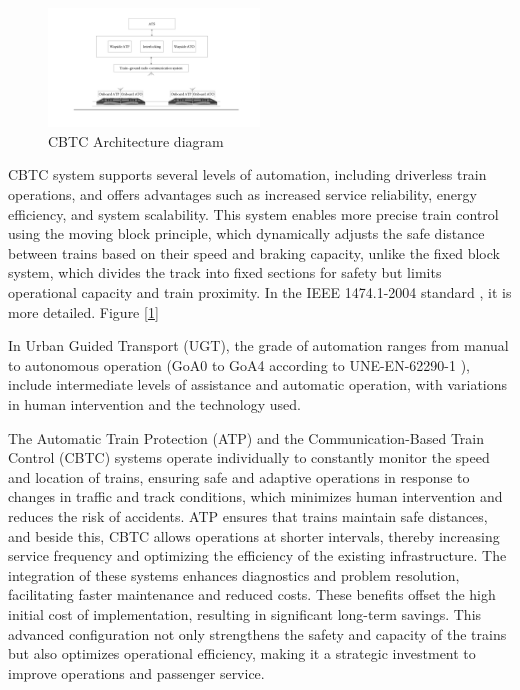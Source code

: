 \documentclass[conference]{IEEEtran}
\begin{document}
\begin{figure}[ht]
    \centering
    \centerline{\includegraphics[width=0.5\textwidth, scale=0.90]{Imagenes_general/esquema_general_arquitectura_CBTC_1.pdf}}
    \caption{CBTC Architecture diagram}
    \label{CBTC Architecture diagram}
\end{figure}

CBTC system supports several levels of automation, including driverless train operations, and offers advantages such as increased service reliability, energy efficiency, and system scalability. This system enables more precise train control using the moving block principle, which dynamically adjusts the safe distance between trains based on their speed and braking capacity, unlike the fixed block system, which divides the track into fixed sections for safety but limits operational capacity and train proximity. In the IEEE 1474.1-2004 standard \cite{b1}, it is more detailed. Figure [\ref{CBTC Architecture diagram}]

In Urban Guided Transport (UGT), the grade of automation ranges from manual to autonomous operation (GoA0 to GoA4 according to UNE-EN-62290-1 \cite{b17}), include intermediate levels of assistance and automatic operation, with variations in human intervention and the technology used.

The Automatic Train Protection (ATP) and the Communication-Based Train Control (CBTC) systems operate individually to constantly monitor the speed and location of trains, ensuring safe and adaptive operations in response to changes in traffic and track conditions, which minimizes human intervention and reduces the risk of accidents. ATP ensures that trains maintain safe distances, and beside this, CBTC allows operations at shorter intervals, thereby increasing service frequency and optimizing the efficiency of the existing infrastructure. The integration of these systems enhances diagnostics and problem resolution, facilitating faster maintenance and reduced costs. These benefits offset the high initial cost of implementation, resulting in significant long-term savings. This advanced configuration not only strengthens the safety and capacity of the trains but also optimizes operational efficiency, making it a strategic investment to improve operations and passenger service.
\end{document}
